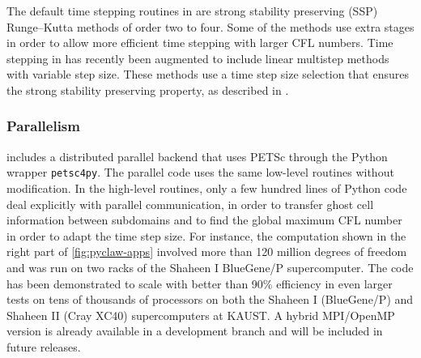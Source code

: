 The default time stepping routines in \sharpclaw are strong stability
preserving (SSP) Runge--Kutta methods of order two to four.
Some of the methods use extra stages in order to allow more efficient
time stepping with larger CFL numbers.
Time stepping in \sharpclaw has recently been augmented to include
linear multistep methods with variable step size.  These methods use
a time step size selection that ensures the strong stability preserving
property, as described in \cite{ssp_lmm_vss}.

\subsubsection{Parallelism}
\pyclaw includes a distributed parallel backend that uses PETSc through
the Python wrapper {\tt petsc4py}.  The parallel code uses the same low-level
routines without modification.  In the high-level routines, only a few hundred
lines of Python code deal explicitly with parallel communication, in order to
transfer ghost cell information between subdomains and to find the global
maximum CFL number in order to adapt the time step size. For instance, the
computation shown in the right part of \cref{fig:pyclaw-apps} involved more than
120 million degrees of freedom and was run on two racks of the Shaheen I
BlueGene/P supercomputer. The code has been demonstrated to scale with better
than 90\% efficiency in even larger tests on tens of thousands of processors on
both the Shaheen I (BlueGene/P) and Shaheen II (Cray XC40) supercomputers at
KAUST. A hybrid MPI/OpenMP version is already available in a development branch
and will be included in future releases.
